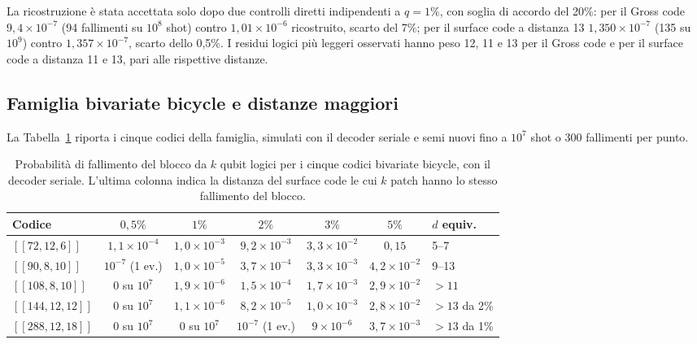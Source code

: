\begin{onehalfspace}
La ricostruzione è stata accettata solo dopo due controlli diretti
indipendenti a $q = 1\%$, con soglia di accordo del 20\%: per il Gross
code $9{,}4\times10^{-7}$ (94 fallimenti su $10^8$ shot) contro
$1{,}01\times10^{-6}$ ricostruito, scarto del 7\%; per il surface code a
distanza 13 $1{,}350\times10^{-7}$ (135 su $10^9$) contro
$1{,}357\times10^{-7}$, scarto dello 0,5\%. I residui logici più leggeri
osservati hanno peso 12, 11 e 13 per il Gross code e per il surface code
a distanza 11 e 13, pari alle rispettive distanze.

\subsection{Famiglia bivariate bicycle e distanze maggiori}
\label{app:gross_famiglia}

La Tabella~\ref{tab:app_gross_famiglia} riporta i cinque codici della
famiglia, simulati con il decoder seriale e semi nuovi fino a $10^7$
shot o 300 fallimenti per punto.

\begin{table}[H]
\centering
\footnotesize
\setlength{\tabcolsep}{3pt}
\begin{tabular}{@{}lcccccl@{}}
\toprule
\textbf{Codice} & $0{,}5\%$ & $1\%$ & $2\%$ & $3\%$ & $5\%$ & \textbf{$d$ equiv.} \\
\midrule
$[[72,12,6]]$ & $1{,}1\times10^{-4}$ & $1{,}0\times10^{-3}$ & $9{,}2\times10^{-3}$ & $3{,}3\times10^{-2}$ & $0{,}15$ & 5--7 \\
$[[90,8,10]]$ & $10^{-7}$ (1 ev.) & $1{,}0\times10^{-5}$ & $3{,}7\times10^{-4}$ & $3{,}3\times10^{-3}$ & $4{,}2\times10^{-2}$ & 9--13 \\
$[[108,8,10]]$ & 0 su $10^7$ & $1{,}9\times10^{-6}$ & $1{,}5\times10^{-4}$ & $1{,}7\times10^{-3}$ & $2{,}9\times10^{-2}$ & $>11$ \\
$[[144,12,12]]$ & 0 su $10^7$ & $1{,}1\times10^{-6}$ & $8{,}2\times10^{-5}$ & $1{,}0\times10^{-3}$ & $2{,}8\times10^{-2}$ & $>13$ da 2\% \\
$[[288,12,18]]$ & 0 su $10^7$ & 0 su $10^7$ & $10^{-7}$ (1 ev.) & $9\times10^{-6}$ & $3{,}7\times10^{-3}$ & $>13$ da 1\% \\
\bottomrule
\end{tabular}
\caption[Famiglia bivariate bicycle]{Probabilità di fallimento del
blocco da $k$ qubit logici per i cinque codici bivariate bicycle, con il
decoder seriale. L'ultima colonna indica la distanza del surface code
le cui $k$ patch hanno lo stesso fallimento del blocco.}
\label{tab:app_gross_famiglia}
\end{table}


\end{onehalfspace}

